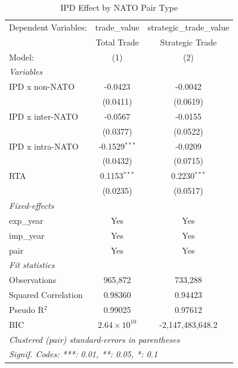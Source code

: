 
\begin{table}[htbp]
   \caption{IPD Effect by NATO Pair Type}
   \centering
   \begin{tabular}{lcc}
      \tabularnewline \midrule \midrule
      Dependent Variables: & trade\_value          & strategic\_trade\_value\\    
                           & Total Trade           & Strategic Trade \\   
      Model:               & (1)                   & (2)\\  
      \midrule
      \emph{Variables}\\
      IPD x non-NATO       & -0.0423               & -0.0042\\   
                           & (0.0411)              & (0.0619)\\   
      IPD x inter-NATO     & -0.0567               & -0.0155\\   
                           & (0.0377)              & (0.0522)\\   
      IPD x intra-NATO     & -0.1529$^{***}$       & -0.0209\\   
                           & (0.0432)              & (0.0715)\\   
      RTA                  & 0.1153$^{***}$        & 0.2230$^{***}$\\   
                           & (0.0235)              & (0.0517)\\   
      \midrule
      \emph{Fixed-effects}\\
      exp\_year            & Yes                   & Yes\\  
      imp\_year            & Yes                   & Yes\\  
      pair                 & Yes                   & Yes\\  
      \midrule
      \emph{Fit statistics}\\
      Observations         & 965,872               & 733,288\\  
      Squared Correlation  & 0.98360               & 0.94423\\  
      Pseudo R$^2$         & 0.99025               & 0.97612\\  
      BIC                  & $2.64\times 10^{10}$  & -2,147,483,648.2\\  
      \midrule \midrule
      \multicolumn{3}{l}{\emph{Clustered (pair) standard-errors in parentheses}}\\
      \multicolumn{3}{l}{\emph{Signif. Codes: ***: 0.01, **: 0.05, *: 0.1}}\\
   \end{tabular}
\end{table}



